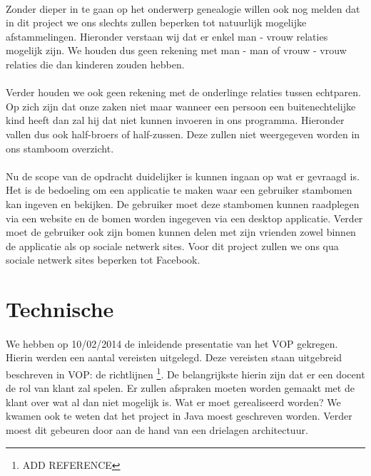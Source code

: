 \documentclass[pdftex,a4paper,12pt,twoside]{report}
\begin{document}
\paragraph{}
Zonder dieper in te gaan op het onderwerp genealogie willen ook nog melden dat in dit project we ons slechts zullen beperken tot natuurlijk mogelijke afstammelingen. Hieronder verstaan wij dat er enkel man - vrouw relaties mogelijk zijn. We houden dus geen rekening met man - man of vrouw - vrouw relaties die dan kinderen zouden hebben.

\paragraph{}
Verder houden we ook geen rekening met de onderlinge relaties tussen echtparen. Op zich zijn dat onze zaken niet maar wanneer een persoon een buitenechtelijke kind heeft dan zal hij dat niet kunnen invoeren in ons programma. Hieronder vallen dus ook half-broers of half-zussen. Deze zullen niet weergegeven worden in ons stamboom overzicht.

\paragraph{}
Nu de scope van de opdracht duidelijker is kunnen ingaan op wat er gevraagd is. Het is de bedoeling om een applicatie te maken waar een gebruiker stambomen kan ingeven en bekijken. De gebruiker moet deze stambomen kunnen raadplegen via een website  en de bomen worden ingegeven via een desktop applicatie. Verder moet de gebruiker ook zijn bomen kunnen delen met zijn vrienden zowel binnen de applicatie als op sociale netwerk sites. Voor dit project zullen we ons qua sociale netwerk sites beperken tot Facebook.

\section{Technische}
\paragraph{}
We hebben op 10/02/2014 de inleidende presentatie van het VOP gekregen. Hierin werden een aantal vereisten uitgelegd. Deze vereisten staan uitgebreid beschreven in VOP: de richtlijnen \footnote{ADD REFERENCE}. De belangrijkste hierin zijn dat er een docent de rol van klant zal spelen. Er zullen afspraken moeten worden gemaakt met de klant over wat al dan niet mogelijk is. Wat er moet gerealiseerd worden? We kwamen ook te weten dat het project in Java moest geschreven worden. Verder moest dit gebeuren door aan de hand van een drielagen architectuur. 
\end{document}
